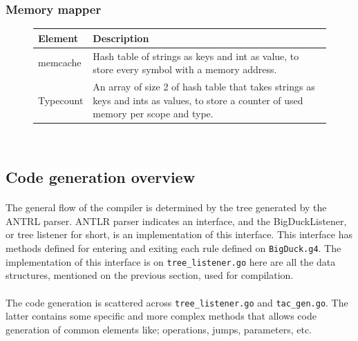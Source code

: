 \subsubsection{Memory mapper}

\begin{figure}[H]
    \centering
    \begin{tabular}{p{1in}p{3in}}
        \toprule
        \textbf{Element} & \textbf{Description}\\
        \midrule memcache &
        Hash table of strings as keys and int as value, to store every symbol
        with a memory address.\\

        \midrule Typecount &
        An array of size 2 of hash table that takes strings as keys and ints as
        values, to store a counter of used memory per scope and type.\\

        \bottomrule
    \end{tabular}\\
\end{figure}

\newpage

\subsection{Code generation overview}

\paragraph{} The general flow of the compiler is determined by the tree
generated by the ANTRL parser. ANTLR parser indicates an interface, and the
BigDuckListener, or tree listener for short, is an implementation of this
interface. This interface has methods defined for entering and exiting each
rule defined on \texttt{BigDuck.g4}. The implementation of this interface
is on \texttt{tree\_listener.go} here are all the data structures, mentioned
on the previous section, used for compilation.

\paragraph{} The code generation is scattered across \texttt{tree\_listener.go}
and \texttt{tac\_gen.go}. The latter contains some specific and more complex
methods that allows code generation of common elements like; operations,
jumps, parameters, etc.

